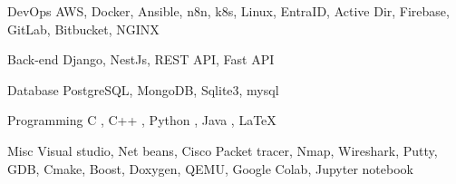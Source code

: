 

\begin{cvskills}

  
  \cvskill
    {DevOps} %
    {AWS, Docker, Ansible, n8n, k8s, Linux, EntraID, Active Dir, Firebase, GitLab, Bitbucket, NGINX} %

  
  \cvskill
    {Back-end} %
    {Django, NestJs, REST API, Fast API} %


  \cvskill
    {Database} %
    {PostgreSQL, MongoDB, Sqlite3, mysql} %


  \cvskill
    {Programming} %
    {C , C++ , Python , Java , LaTeX} %


  \cvskill
    {Misc} %
    {Visual studio, Net beans, Cisco Packet tracer, Nmap, Wireshark, Putty, GDB, Cmake, Boost, Doxygen, QEMU, Google Colab, Jupyter notebook} %


\end{cvskills}
